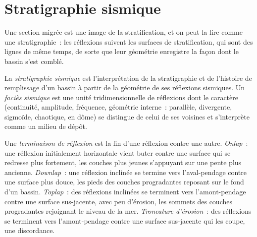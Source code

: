 \section{Stratigraphie sismique}

Une section migrée est une image de la stratification, et on peut la lire
comme une stratigraphie~: les réflexions suivent les surfaces de stratification, qui sont
des lignes de même temps, de sorte que leur géométrie enregistre la façon dont le bassin s'est comblé.

\begin{definition}\label{def:b3:exploration-seismology:seismic-stratigraphy}
La \emph{stratigraphie sismique} est l'interprétation
de la stratigraphie et de l'histoire de remplissage d'un bassin à partir de la géométrie
de ses réflexions sismiques. Un \emph{faciès sismique} est une
unité tridimensionnelle de réflexions dont le caractère (continuité, amplitude,
fréquence, géométrie interne~: parallèle, divergente, sigmoïde, chaotique, en dôme) se
distingue de celui de ses voisines et s'interprète comme un milieu
de dépôt.
\end{definition}

\begin{definition}\label{def:b3:exploration-seismology:terminations}
Une \emph{terminaison de réflexion} est la fin d'une
réflexion contre une autre. \emph{Onlap}~: une réflexion initialement horizontale
vient buter contre une surface qui se redresse plus fortement, les couches plus jeunes
s'appuyant sur une pente plus ancienne. \emph{Downlap}~: une réflexion inclinée
se termine vers l'aval-pendage contre une surface plus douce, les pieds des couches progradantes
reposant sur le fond d'un bassin. \emph{Toplap}~: des réflexions inclinées
se terminent vers l'amont-pendage contre une surface sus-jacente, avec peu d'érosion, les sommets
des couches progradantes rejoignant le niveau de la mer. \emph{Troncature
d'érosion}~: des réflexions se terminent vers l'amont-pendage
contre une surface sus-jacente qui les coupe, une discordance.
\end{definition}

